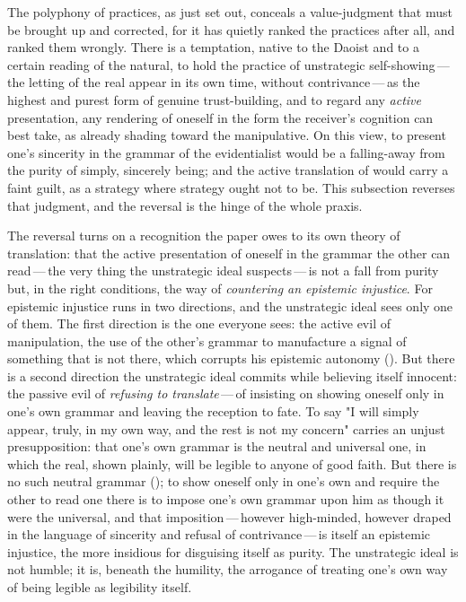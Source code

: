 The polyphony of practices, as just set out, conceals a value-judgment that must be brought up and corrected, for it has quietly ranked the practices after all, and ranked them wrongly. There is a temptation, native to the Daoist and to a certain reading of the natural, to hold the practice of unstrategic self-showing\,---\,the letting of the real appear in its own time, without contrivance\,---\,as the highest and purest form of genuine trust-building, and to regard any \emph{active} presentation, any rendering of oneself in the form the receiver's cognition can best take, as already shading toward the manipulative. On this view, to present one's sincerity in the grammar of the evidentialist would be a falling-away from the purity of simply, sincerely being; and the active translation of  would carry a faint guilt, as a strategy where strategy ought not to be. This subsection reverses that judgment, and the reversal is the hinge of the whole praxis.

The reversal turns on a recognition the paper owes to its own theory of translation: that the active presentation of oneself in the grammar the other can read\,---\,the very thing the unstrategic ideal suspects\,---\,is not a fall from purity but, in the right conditions, the way of \emph{countering an epistemic injustice}. For epistemic injustice runs in two directions, and the unstrategic ideal sees only one of them. The first direction is the one everyone sees: the active evil of manipulation, the use of the other's grammar to manufacture a signal of something that is not there, which corrupts his epistemic autonomy (). But there is a second direction the unstrategic ideal commits while believing itself innocent: the passive evil of \emph{refusing to translate}\,---\,of insisting on showing oneself only in one's own grammar and leaving the reception to fate. To say "I will simply appear, truly, in my own way, and the rest is not my concern" carries an unjust presupposition: that one's own grammar is the neutral and universal one, in which the real, shown plainly, will be legible to anyone of good faith. But there is no such neutral grammar (); to show oneself only in one's own and require the other to read one there is to impose one's own grammar upon him as though it were the universal, and that imposition\,---\,however high-minded, however draped in the language of sincerity and refusal of contrivance\,---\,is itself an epistemic injustice, the more insidious for disguising itself as purity. The unstrategic ideal is not humble; it is, beneath the humility, the arrogance of treating one's own way of being legible as legibility itself.

